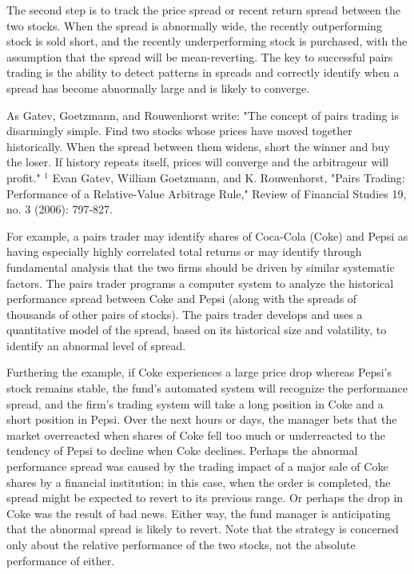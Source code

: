 \documentclass[11pt]{article}
\begin{document}
The second step is to track the price spread or recent return spread between the two stocks. When the spread is abnormally wide, the recently outperforming stock is sold short, and the recently underperforming stock is purchased, with the assumption that the spread will be mean-reverting. The key to successful pairs trading is the ability to detect patterns in spreads and correctly identify when a spread has become abnormally large and is likely to converge.

As Gatev, Goetzmann, and Rouwenhorst write: "The concept of pairs trading is disarmingly simple. Find two stocks whose prices have moved together historically. When the spread between them widens, short the winner and buy the loser. If history repeats itself, prices will converge and the arbitrageur will profit." ${ }^{1}$ Evan Gatev, William Goetzmann, and K. Rouwenhorst, "Pairs Trading: Performance of a Relative-Value Arbitrage Rule," Review of Financial Studies 19, no. 3 (2006): 797-827.

For example, a pairs trader may identify shares of Coca-Cola (Coke) and Pepsi as having especially highly correlated total returns or may identify through fundamental analysis that the two firms should be driven by similar systematic factors. The pairs trader programs a computer system to analyze the historical performance spread between Coke and Pepsi (along with the spreads of thousands of other pairs of stocks). The pairs trader develops and uses a quantitative model of the spread, based on its historical size and volatility, to identify an abnormal level of spread.

Furthering the example, if Coke experiences a large price drop whereas Pepsi's stock remains stable, the fund's automated system will recognize the performance spread, and the firm's trading system will take a long position in Coke and a short position in Pepsi. Over the next hours or days, the manager bets that the market overreacted when shares of Coke fell too much or underreacted to the tendency of Pepsi to decline when Coke declines. Perhaps the abnormal performance spread was caused by the trading impact of a major sale of Coke shares by a financial institution; in this case, when the order is completed, the spread might be expected to revert to its previous range. Or perhaps the drop in Coke was the result of bad news. Either way, the fund manager is anticipating that the abnormal spread is likely to revert. Note that the strategy is concerned only about the relative performance of the two stocks, not the absolute performance of either.
\end{document}
